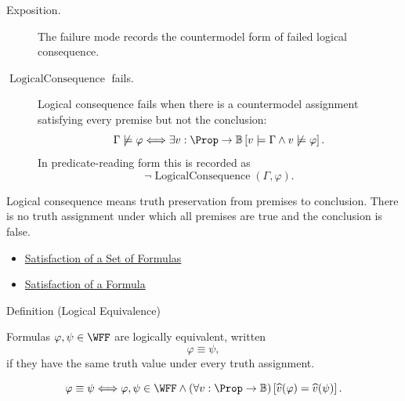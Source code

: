 \begin{remark*}
\begin{description}
  \item[Exposition.] The failure mode records the countermodel form of failed
  logical consequence.
  \item[\(\operatorname{LogicalConsequence}\) fails.] Logical consequence
  fails when there is a countermodel assignment satisfying every premise but
  not the conclusion:
  \[
  \Gamma\not\models\varphi
  \Longleftrightarrow
  \exists v:\Prop\to\mathbb{B}
  \left[
  v\models\Gamma
  \land
  v\not\models\varphi
  \right].
  \]
  In predicate-reading form this is recorded as
  \[
  \neg\operatorname{LogicalConsequence}(\Gamma,\varphi).
  \]
\end{description}
\end{remark*}

\begin{remark*}[Interpretation]
Logical consequence means truth preservation from premises to conclusion. There is no truth assignment under which all premises are true and the conclusion is false.
\end{remark*}

\begin{dependencies}
\begin{itemize}
  \item \hyperref[def:satisfaction-set-propositional-logic]{Satisfaction of a Set of Formulas}
  \item \hyperref[def:satisfaction-propositional-formula]{Satisfaction of a Formula}
\end{itemize}
\end{dependencies}
\begin{definitionbox}{Definition (Logical Equivalence)}
\begin{definition}
\label{def:logical-equivalence-propositional-logic}
Formulas \(\varphi,\psi\in\WFF\) are logically equivalent, written
\[
\varphi\equiv\psi,
\]
if they have the same truth value under every truth assignment.
\end{definition}
\end{definitionbox}

\begin{remark*}
\[
\varphi\equiv\psi
\Longleftrightarrow
\varphi,\psi\in\WFF
\land
(\forall v:\Prop\to\mathbb{B})
\left[
\widehat v(\varphi)=\widehat v(\psi)
\right].
\]
\end{remark*}

